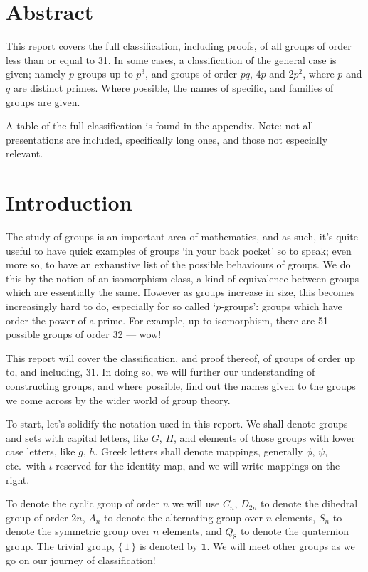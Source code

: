 \section{Abstract}
This report covers the full classification, including proofs, of all groups of order less than or equal to 31.
In some cases, a classification of the general case is given; namely \(p\)-groups up to \(p^3\), and groups of
order \(pq\), \(4p\) and \(2p^2\), where \(p\) and \(q\) are distinct primes.
Where possible, the names of specific, and families of groups are given.

A table of the full classification is found in the appendix.
Note: not all presentations are included, specifically long ones, and those not especially relevant.

\section{Introduction}
The study of groups is an important area of mathematics, and as such, it's quite useful to have quick examples of groups
`in your back pocket' so to speak; even more so, to have an exhaustive list of the possible behaviours of groups.
We do this by the notion of an isomorphism class, a kind of equivalence between groups which are essentially the same.
However as groups increase in size, this becomes increasingly hard to do, especially for so called `\(p\)-groups':
groups which have order the power of a prime.
For example, up to isomorphism, there are 51 possible groups of order 32 --- wow!

This report will cover the classification, and proof thereof, of groups of order up to, and including, 31.
In doing so, we will further our understanding of constructing groups, and where possible, find out the names given to
the groups we come across by the wider world of group theory.

To start, let's solidify the notation used in this report.
We shall denote groups and sets with capital letters, like \(G\), \(H\), and elements of those groups with lower case
letters, like \(g\), \(h\).
Greek letters shall denote mappings, generally \(\phi\), \(\psi\), etc.\ with \(\iota\) reserved for the identity map,
and we will write mappings on the right.

To denote the cyclic group of order \(n\) we will use \(C_n\), \(D_{2n}\) to denote the dihedral group of order \(2n\),
\(A_n\) to denote the alternating group over \(n\) elements, \(S_n\) to denote the symmetric group over \(n\)
elements, and \(Q_8\) to denote the quaternion group.
The trivial group, \(\{\, 1\, \}\) is denoted by \(\bm{1}\).
We will meet other groups as we go on our journey of classification!

